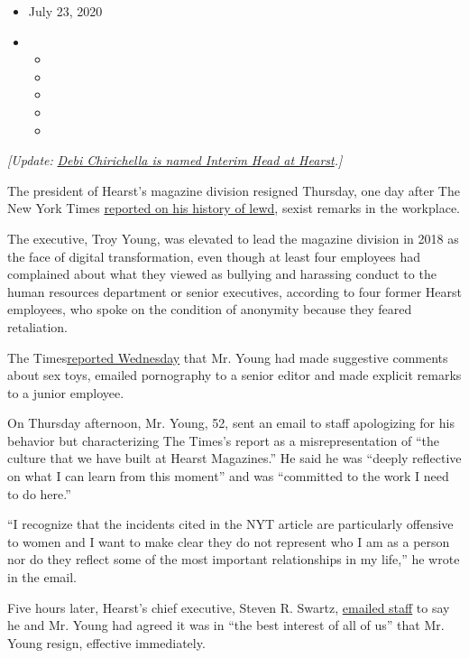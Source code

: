 \begin{itemize}
\item
  July 23, 2020
\item
  \begin{itemize}
  \item
  \item
  \item
  \item
  \item
  \end{itemize}
\end{itemize}

\emph{{[}Update:}
\href{https://www.nytimes3xbfgragh.onion/2020/07/24/business/media/hearst-troy-young-replacement-president.html}{\emph{Debi
Chirichella is named Interim Head at Hearst}}\emph{.{]}}

The president of Hearst's magazine division resigned Thursday, one day
after The New York Times
\href{https://www.nytimes3xbfgragh.onion/2020/07/22/business/media/hearst-harassment-troy-young.html}{reported
on his history of lewd}, sexist remarks in the workplace.

The executive, Troy Young, was elevated to lead the magazine division in
2018 as the face of digital transformation, even though at least four
employees had complained about what they viewed as bullying and
harassing conduct to the human resources department or senior
executives, according to four former Hearst employees, who spoke on the
condition of anonymity because they feared retaliation.

The
Times\href{https://www.nytimes3xbfgragh.onion/2020/07/22/business/media/hearst-harassment-troy-young.html}{reported
Wednesday} that Mr. Young had made suggestive comments about sex toys,
emailed pornography to a senior editor and made explicit remarks to a
junior employee.

On Thursday afternoon, Mr. Young, 52, sent an email to staff apologizing
for his behavior but characterizing The Times's report as a
misrepresentation of ``the culture that we have built at Hearst
Magazines.'' He said he was ``deeply reflective on what I can learn from
this moment'' and was ``committed to the work I need to do here.''

``I recognize that the incidents cited in the NYT article are
particularly offensive to women and I want to make clear they do not
represent who I am as a person nor do they reflect some of the most
important relationships in my life,'' he wrote in the email.

Five hours later, Hearst's chief executive, Steven R. Swartz,
\href{https://www.hearst.com/-/a-message-from-steve-swartz-2}{emailed
staff} to say he and Mr. Young had agreed it was in ``the best interest
of all of us'' that Mr. Young resign, effective immediately.

